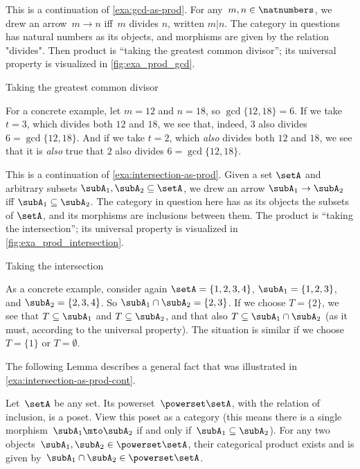 \begin{example}
    \label{exa:gcd-as-prod-cont}
    This is a continuation of \cref{exa:gcd-as-prod}. For any~$m, n \in \natnumbers$, we drew an arrow~$m \to n$ iff~$m$ divides $n$, written $m | n$. The category in questions has natural numbers as its objects, and morphisms are given by the relation "divides". Then product is ``taking the greatest common divisor''; its universal property is visualized in \cref{fig:exa_prod_gcd}.
    \begin{marginfigure}
        \centering
        \caption{Taking the greatest common divisor}
        \label{fig:exa_prod_gcd_cont}
    \end{marginfigure}
    For a concrete example, let $m = 12$ and $n = 18$, so $\gcd \{12, 18 \} = 6$. If we take $t = 3$, which divides both $12$ and $18$, we see that, indeed, $3$ also divides $6 = \gcd \{12, 18 \}$. And if we take $t = 2$, which \emph{also} divides both $12$ and $18$, we see that it is \emph{also} true that $2$ also divides $6 = \gcd \{12, 18 \}$.
\end{example}

\begin{example}
    \label{exa:intersection-as-prod-cont}
    This is a continuation of \cref{exa:intersection-as-prod}.
    Given a set $\setA$ and arbitrary subsets $\subA_1, \subA_2 \subseteq \setA$, we drew an arrow $\subA_1 \to \subA_2$ iff $\subA_1 \subseteq \subA_2$. The category in question here has as its objects the subsets of $\setA$, and its morphisms are inclusions between them. The product is ``taking the intersection''; its universal property is visualized in \cref{fig:exa_prod_intersection}.
    \begin{marginfigure}
        \centering
        \caption{Taking the intersection}
        \label{fig:exa_prod_intersection_cont}
    \end{marginfigure}
    As a concrete example, consider again $\setA = \{ 1, 2, 3, 4 \}$, $\subA_1 = \{ 1, 2, 3 \}$, and $\subA_2 = \{2, 3, 4 \}$. So $\subA_1 \cap \subA_2 = \{2, 3 \}$. If we choose $T = \{ 2 \}$, we see that $T \subseteq \subA_1$ and $T \subseteq \subA_2$, and that also $T \subseteq \subA_1 \cap \subA_2$ (as it must, according to the universal property). The situation is similar if we choose $T = \{ 1\}$ or $T = \emptyset$.
\end{example}

The following Lemma describes a general fact that was illustrated in \cref{exa:intersection-as-prod-cont}.
\begin{lemma}
    \label{lem:cat-product-powerset}
    Let~$\setA$ be any set.
    Its powerset~$\powerset \setA$, with the relation of inclusion, is a poset.
    View this poset as a category (this means there is a single morphism~$\subA_1 \mto \subA_2$ if and only if~$\subA_1 \subseteq \subA_2$).
    For any two objects~$\subA_1, \subA_2 \in \powerset \setA$, their categorical product exists and is given by~$\subA_1 \cap \subA_2 \in \powerset \setA$.
\end{lemma}

